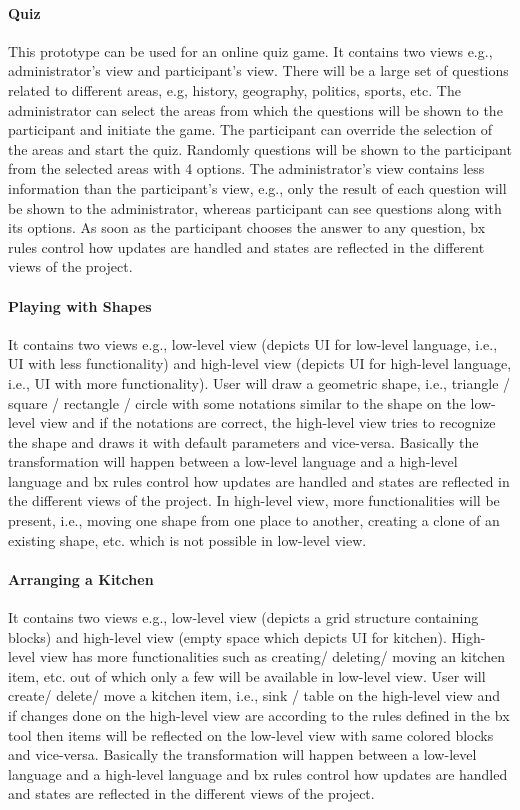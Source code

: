 \paragraph{Quiz} This prototype can be used for an online quiz game. It contains two views e.g., administrator's view and participant's view.
There will be a large set of questions related to different areas, e.g, history, geography, politics, sports, etc. The administrator can select the areas from which the questions will be shown to the participant and initiate the game. The participant can override the selection of the areas and start the quiz. Randomly questions will be shown to the participant from the selected areas with 4 options. The administrator's view contains less information than the participant's view, e.g., only the result of each question will be shown to the administrator, whereas participant can see questions along with its options. As soon as the participant chooses the answer to any question, bx rules control how updates are handled and states are reflected in the different views of the project.

\paragraph{Playing with Shapes} It contains two views e.g., low-level view (depicts \ac{UI} for low-level language, i.e., UI with less functionality) and high-level view (depicts UI for high-level language, i.e., UI with more functionality). User will draw a geometric shape, i.e., triangle / square / rectangle / circle with some notations similar to the shape on the low-level view and if the notations are correct, the high-level view tries to recognize the shape and draws it with default parameters and vice-versa. Basically the transformation will happen between a low-level language and a high-level language and bx rules control how updates are handled and states are reflected in the different views of the project. In high-level view, more functionalities will be present, i.e., moving one shape from one place to another, creating a clone of an existing shape, etc. which is not possible in low-level view.

\paragraph{Arranging a Kitchen}
It contains two views e.g., low-level view (depicts a grid structure containing blocks) and high-level view (empty space which depicts UI for kitchen). High-level view has more functionalities such as creating/ deleting/ moving an kitchen item, etc. out of which only a few will be available in low-level view. User will create/ delete/ move a kitchen item, i.e., sink / table on the high-level view and if changes done on the high-level view are according to the rules defined in the bx tool then items will be reflected on the low-level view with same colored blocks and vice-versa. Basically the transformation will happen between a low-level language and a high-level language and bx rules control how updates are handled and states are reflected in the different views of the project.

